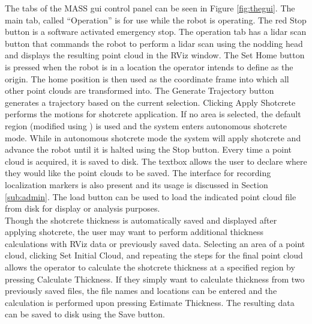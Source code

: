 The tabs of the MASS \acrshort{gui} control panel can be seen in Figure \ref{fig:thegui}. The main tab, called ``Operation'' is for use while the robot is operating. The red Stop button is a software activated emergency stop. The operation tab has a \acrshort{lidar} scan button that commands the robot to perform a \acrshort{lidar} scan using the nodding head and displays the resulting point cloud in the RViz window. The Set Home button is pressed when the robot is in a location the operator intends to define as the origin. The home position is then used as the coordinate frame into which all other point clouds are transformed into. The Generate Trajectory button generates a trajectory based on the current selection. Clicking Apply Shotcrete performs the motions for shotcrete application. If no area is selected, the default region (modified using ) is used and the system enters autonomous shotcrete mode. While in autonomous shotcrete mode the system will apply shotcrete and advance the robot until it is halted using the Stop button. Every time a point cloud is acquired, it is saved to disk. The textbox allows the user to declare where they would like the point clouds to be saved. The interface for recording localization markers is also present and its usage is discussed in Section \ref{sub:admin}. The load button can be used to load the indicated point cloud file from disk for display or analysis purposes.\\

Though the shotcrete thickness is automatically saved and displayed after applying shotcrete, the user may want to perform additional thickness calculations with RViz data or previously saved data. Selecting an area of a point cloud, clicking Set Initial Cloud, and repeating the steps for the final point cloud allows the operator to calculate the shotcrete thickness at a specified region by pressing Calculate Thickness. If they simply want to calculate thickness from two previously saved files, the file names and locations can be entered and the calculation is performed upon pressing Estimate Thickness. The resulting data can be saved to disk using the Save button.\\

